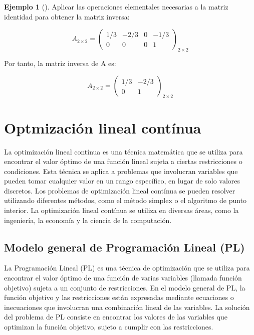 \documentclass[
  letterpaper,
  DIV=11,
  numbers=noendperiod]{scrreprt}
\theoremstyle{definition}
\newtheorem{example}{Ejemplo}[chapter]
\theoremstyle{definition}
\theoremstyle{remark}
\begin{document}
\begin{example}[]
Aplicar las operaciones elementales necesarias a la matriz identidad
para obtener la matriz inversa:

\begin{equation*}
A_{2 \times 2}=
\begin{pmatrix}
1/3 & -2/3 & 0 & -1/3 \\
0 & 0 & 0 & 1 
\end{pmatrix} _{2 \times 2}
\end{equation*}

Por tanto, la matriz inversa de A es:

\begin{equation*}
A_{2 \times 2}=
\begin{pmatrix}
1/3 & -2/3 \\
0 & 1 
\end{pmatrix} _{2 \times 2}
\end{equation*}

\end{example}

\hypertarget{optmizaciuxf3n-lineal-contuxednua}{%
\chapter{Optmización lineal
contínua}\label{optmizaciuxf3n-lineal-contuxednua}}

La optimización lineal contínua es una técnica matemática que se utiliza
para encontrar el valor óptimo de una función lineal sujeta a ciertas
restricciones o condiciones. Esta técnica se aplica a problemas que
involucran variables que pueden tomar cualquier valor en un rango
específico, en lugar de solo valores discretos. Los problemas de
optimización lineal contínua se pueden resolver utilizando diferentes
métodos, como el método simplex o el algoritmo de punto interior. La
optimización lineal contínua se utiliza en diversas áreas, como la
ingeniería, la economía y la ciencia de la computación.

\hypertarget{modelo-general-de-programaciuxf3n-lineal-pl}{%
\section{Modelo general de Programación Lineal
(PL)}\label{modelo-general-de-programaciuxf3n-lineal-pl}}

La Programación Lineal (PL) es una técnica de optimización que se
utiliza para encontrar el valor óptimo de una función de varias
variables (llamada función objetivo) sujeta a un conjunto de
restricciones. En el modelo general de PL, la función objetivo y las
restricciones están expresadas mediante ecuaciones o inecuaciones que
involucran una combinación lineal de las variables. La solución del
problema de PL consiste en encontrar los valores de las variables que
optimizan la función objetivo, sujeto a cumplir con las restricciones.
\end{document}

